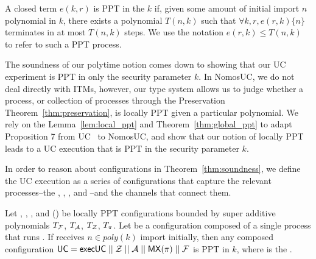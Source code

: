 \begin{ddef}[PPT in $k$]\label{def:ppt}
A closed term $e(k,r)$ is  PPT in the $k$ if, given some amount of initial import $n$ polynomial in $k$, there exists a polynomial $T(n,k)$ such that $\forall k, r, e(r,k) \{n\}$ terminates in at most $T(n,k)$ steps.
We use the notation $e(r,k) \leq T(n,k)$ to refer to such a PPT process.
\end{ddef}

The soundness of our polytime notion comes down to showing that our UC experiment is PPT in only the security parameter $k$. 
In NomosUC, we do not deal directly with ITMs, however, our type system allows us to judge whether a process, or collection of processes through the Preservation Theorem~\ref{thm:preservation}, is locally PPT given a particular polynomial. 
We rely on the Lemma~\ref{lem:local_ppt} and Theorem~\ref{thm:global_ppt} to adapt Proposition 7 from UC~\cite{canettiUC} to NomosUC, and show that our notion of locally PPT leads to a UC execution that is PPT in the security parameter $k$.

In order to reason about configurations in Theorem~\ref{thm:soundness}, we define the UC execution as a series of configurations that capture the relevant processes--the \partywrapper, \Z, \F, and \A--and the channels that connect them.

\begin{theorem} \label{thm:soundness}
Let \F, \A, \Z, and (\PI) be locally PPT configurations bounded by super additive polynomials $T_\mathcal{F}$, $T_\mathcal{A}$, $T_\mathcal{Z}$, $T_\pi$. Let  be a configuration composed of a single process that runs . If  receives $n \in poly(k)$ import initially, then any composed configuration $\mathsf{UC} = \mathsf{execUC} \; || \; \mathcal{Z} \; || \; \mathcal{A} \; || \; \mathsf{MX}(\pi) \; || \; \mathcal{F}$ is PPT in $k$, where  is the \partywrapper.
\end{theorem}


